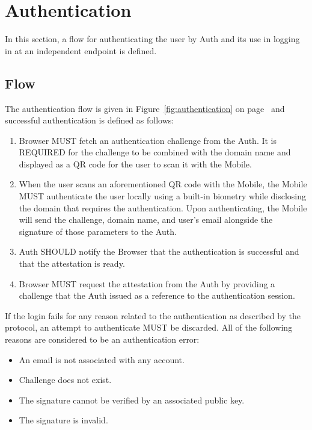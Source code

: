 \section{Authentication}
In this section, a flow for authenticating the user by Auth and its use in logging in at an independent endpoint
is defined.

    \subsection{Flow}
    The authentication flow is given in Figure~\ref{fig:authentication} on page~\pageref{fig:authentication} and 
    successful authentication is defined as follows:
        \begin{enumerate}
            \item Browser MUST fetch an authentication challenge from the Auth. It is REQUIRED for the challenge 
                  to be combined with the domain name and displayed as a QR code for the user to scan it with 
                  the Mobile.
            \item When the user scans an aforementioned QR code with the Mobile, the Mobile MUST authenticate the 
                  user locally using a built-in biometry while disclosing the domain that requires the authentication.
                  Upon authenticating, the Mobile will send the challenge, domain name, and user's email alongside the
                  signature of those parameters to the Auth.
            \item Auth SHOULD notify the Browser that the authentication is successful and that the attestation is
                  ready.
            \item Browser MUST request the attestation from the Auth by providing a challenge that the Auth issued 
                  as a reference to the authentication session.
        \end{enumerate}
        
    If the login fails for any reason related to the authentication as described by the protocol, an attempt to 
    authenticate MUST be discarded. All of the following reasons are considered to be an authentication error:
        \begin{itemize}
            \item An email is not associated with any account.
            \item Challenge does not exist.
            \item The signature cannot be verified by an associated public key.
            \item The signature is invalid.
        \end{itemize}

